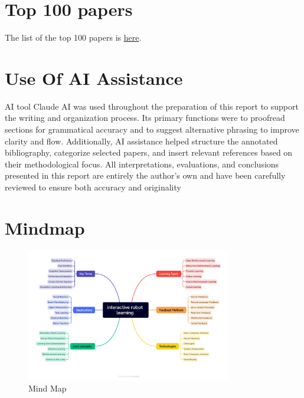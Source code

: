 \documentclass[report.tex]{subfiles}
\begin{document}
        \section{Top 100 papers}
        The list of the top 100 papers is \href{https://drive.google.com/file/d/19iwr8xqD-wopxZIMe9OjLMB2xNGlfBga/view?usp=sharing} {here}.
        \section{Use Of AI Assistance}
        
            {AI tool Claude AI was used throughout the preparation of this report to support the writing
and organization process. Its primary functions were to proofread sections for grammatical accuracy
and to suggest alternative phrasing to improve clarity and flow. Additionally, AI assistance helped
structure the annotated bibliography, categorize selected papers, and insert relevant references based
on their methodological focus. All interpretations, evaluations, and conclusions presented in this
report are entirely the author’s own and have been carefully reviewed to ensure both accuracy and
originality}
        
        \clearpage 
        \section{Mindmap}
            \begin{figure}[h]
                \centering
                \includegraphics[width=0.8\textwidth]{images/Mind-Map.png} 
                \caption{Mind Map}
                \label{fig:your-label}
            \end{figure}
        \clearpage  


        
    
\end{document}

